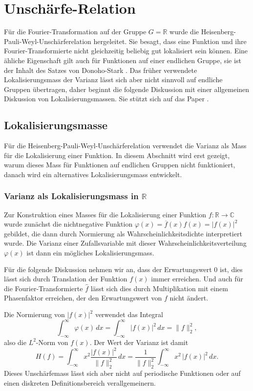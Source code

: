 %
%
%
\section{Unschärfe-Relation
\label{buch:diskret:section:unschaerfe}}
Für die Fourier-Transformation auf der Gruppe $G=\mathbb{R}$ wurde die
Heisenberg-Pauli-Weyl-Unschärferelation hergeleitet.
Sie besagt, dass eine Funktion und ihre Fourier-Transformierte nicht
gleichzeitig beliebig gut lokalisiert sein können.
Eine ähliche Eigenschaft gilt auch für Funktionen auf einer endlichen
Gruppe, sie ist der Inhalt des Satzes von Donoho-Stark
\cite{buch:donoho-stark}.
Das früher verwendete Lokalisierungsmass der Varianz lässt sich aber
nicht sinnvoll auf endliche Gruppen übertragen, daher beginnt die 
folgende Diskussion mit einer allgemeinen Diskussion von Lokalisierungsmassen.
Sie stützt sich auf das Paper \cite{buch:widgerson}.

%
%
\subsection{Lokalisierungsmasse}
Für die Heisenberg-Pauli-Weyl-Unschärferelation verwendet die Varianz
als Mass für die Lokalisierung einer Funktion.
In diesem Abschnitt wird erst gezeigt, warum dieses Mass für Funktionen
auf endlichen Gruppen nicht funktioniert, danach wird ein alternatives
Lokalisierungsmass entwickelt.

\subsubsection{Varianz als Lokalisierungsmass in $\mathbb{R}$}
Zur Konstruktion eines Masses für die Lokalisierung einer Funktion
$f\colon \mathbb{R}\to\mathbb{C}$ wurde zunächst die nichtnegative
Funktion $\varphi(x) = \overline{f}(x)f(x) = |f(x)|^2$ gebildet,
die dann durch Normierung als Wahrscheinlichkeitsdichte interpretiert
wurde.
Die Varianz einer Zufallsvariable mit dieser Wahrscheinlichkeitsverteilung
$\varphi(x)$ ist dann ein mögliches Lokalisierungsmass.

Für die folgende Diskussion nehmen wir an, dass der Erwartungswert $0$
ist, dies lässt sich durch Translation der Funktion $f(x)$ immer erreichen.
Und auch für die Fourier-Transformierte $\hat{f}$ lässt sich dies
durch Multiplikation mit einem Phasenfaktor erreichen, der den
Erwartungswert von $f$ nicht ändert.

Die Normierung von $|f(x)|^2$ verwendet das Integral
\[
\int_{-\infty}^\infty \varphi(x) \,dx
=
\int_{-\infty}^\infty |f(x)|^2\,dx
=
\|f\|_2^2,
\]
also die $L^2$-Norm von $f(x)$.
Der Wert der Varianz ist damit
\[
H(f)
=
\int_{-\infty}^{\infty}
x^2
\frac{|f(x)|^2}{\|f\|_2^2} \,dx
=
\frac{1}{\|f\|_2^2}
\int_{-\infty}^{\infty} x^2\,|f(x)|^2\,dx.
\]
Dieses Unschärfemass lässt sich aber nicht auf periodische Funktionen
oder auf einen diskreten Definitionsbereich verallgemeinern.

